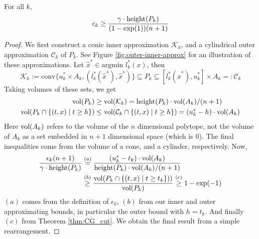 \begin{lem}\label{lem:cg-epsilon-lower-bound}
For all $k$,
\[
\epsilon_k\geq \frac{\gamma \cdot \mbox{\rm height}(P_k)}{(1-\exp(1))(n+1)}
\]
\end{lem}
\begin{proof}
We first construct a conic inner approximation $\mathcal{K}_k$, and a cylindrical outer approximation $\mathcal{C}_k$ of $P_k$. See Figure \ref{fig:outer-inner-approx} for an illustration of these approximations. Let $\hat{x}^*\in \mbox{argmin } l^*_k(x)$, then
\[
\mathcal{K}_{k}:=\mbox{conv}\{u_{k}^{*}\times A_{k},(l_{k}^{*}(\hat{x}^*),\hat{x}^*)\}\subseteq P_{k}\subseteq [l_{k}^{*}(\hat{x}^*),u_{k}^{*}] \times A_{k}=:\mathcal{C}_{k}
\]
Taking volumes of these sets, we get
\begin{align*}
\textnormal{vol}(P_{k}) & \geq\textnormal{vol}(\mathcal{K}_{k}) = \mbox{height}(P_{k})\cdot\textnormal{vol}(A_{k})/(n+1)\\
\textnormal{vol}(P_{k}\cap\{(t,x)\mid t\geq h\}) & \leq\textnormal{vol}(\mathcal{C}_{k}\cap\{(t,x)\mid t\geq h\})=(u_{k}^{*}-h)\cdot\textnormal{vol}(A_{k})
\end{align*}
Here $\textnormal{vol}(A_k)$ refers to the volume of the $n$ dimensional polytope, not the volume of $A_k$ as a set embedded in $n+1$ dimensional space (which is 0). The final inequalities come from the volume of a cone, and a cylinder, respectively. Now,
\begin{align*}
\frac{\epsilon_k(n+1)}{\gamma \cdot \mbox{height}(P_{k})}
& \overset{(a)}{=}\frac{(u_{k}^{*}-t_k)\cdot\textnormal{vol}(A_{k})}{\mbox{height}(P_{k})\cdot\textnormal{vol}(A_{k})/(n+1)}\\
& \overset{(b)}{\geq}\frac{\textnormal{vol}(P_{k}\cap\{(t,x)\mid t\geq t_k\}))}{\textnormal{vol}(P_{k})}
\overset{(c)}{\geq}1-\exp(-1)
\end{align*}
$(a)$ comes from the definition of $\epsilon_k$, $(b)$ from our inner and outer approximating bounds, in particular the outer bound with $h=t_k$. And finally $(c)$ from Theorem \ref{thm:CG_cut}. We obtain the final result from a simple rearrangement.
\end{proof}

